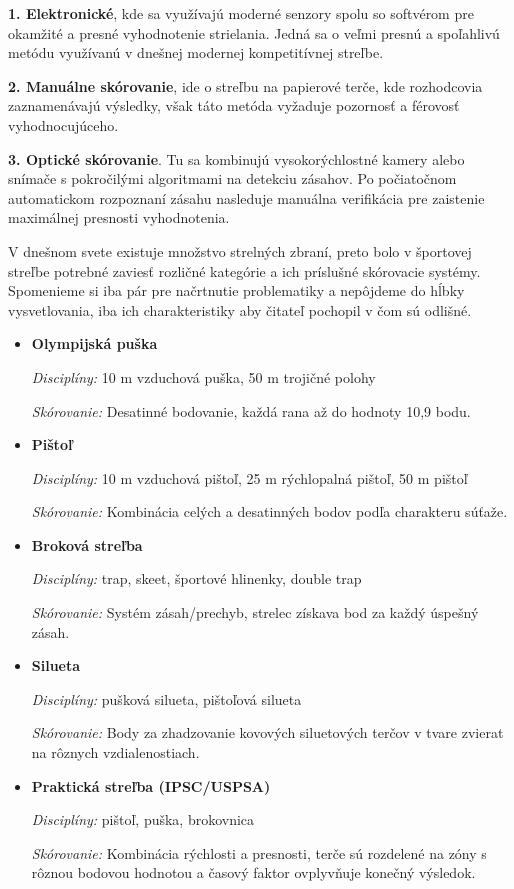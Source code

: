 \textbf{1. Elektronické}, kde sa využívajú moderné senzory spolu so 
softvérom pre okamžité a presné vyhodnotenie strielania. Jedná sa o veľmi presnú a spoľahlivú metódu
využívanú v dnešnej modernej kompetitívnej streľbe. 

\textbf{2. Manuálne skórovanie}, ide o streľbu
na papierové terče, kde rozhodcovia zaznamenávajú výsledky, však táto metóda vyžaduje pozornosť a férovosť
vyhodnocujúceho. 

\textbf{3. Optické skórovanie}. Tu sa kombinujú vysokorýchlostné kamery alebo snímače s pokročilými algoritmami na detekciu zásahov. 
Po počiatočnom automatickom rozpoznaní zásahu nasleduje manuálna verifikácia pre zaistenie maximálnej presnosti vyhodnotenia.

V dnešnom svete existuje množstvo strelných zbraní, preto bolo v športovej streľbe potrebné zaviesť
rozličné kategórie a ich príslušné skórovacie systémy. Spomenieme si iba pár pre načrtnutie problematiky a 
nepôjdeme do hĺbky vysvetlovania, iba ich charakteristiky aby čitateľ pochopil v čom sú odlišné.

\begin{itemize}
  \item \textbf{Olympijská puška}

  \emph{Disciplíny:} 10 m vzduchová puška, 50 m trojičné polohy

  \emph{Skórovanie:} Desatinné bodovanie, každá rana až do hodnoty 10,9 bodu.

  \item \textbf{Pištoľ}

  \emph{Disciplíny:} 10 m vzduchová pištoľ, 25 m rýchlopalná pištoľ, 50 m pištoľ

  \emph{Skórovanie:} Kombinácia celých a desatinných bodov podľa charakteru súťaže.

  \item \textbf{Broková streľba}

  \emph{Disciplíny:} trap, skeet, športové hlinenky, double trap

  \emph{Skórovanie:} Systém zásah/prechyb, strelec získava bod za každý úspešný zásah.

  \item \textbf{Silueta}

  \emph{Disciplíny:} pušková silueta, pištoľová silueta

  \emph{Skórovanie:} Body za zhadzovanie kovových siluetových terčov v tvare zvierat na rôznych vzdialenostiach.

  \item \textbf{Praktická streľba (IPSC/USPSA)}

  \emph{Disciplíny:} pištoľ, puška, brokovnica

  \emph{Skórovanie:} Kombinácia rýchlosti a presnosti, terče sú rozdelené na zóny s rôznou bodovou hodnotou a 
  časový faktor ovplyvňuje konečný výsledok.
\end{itemize}

